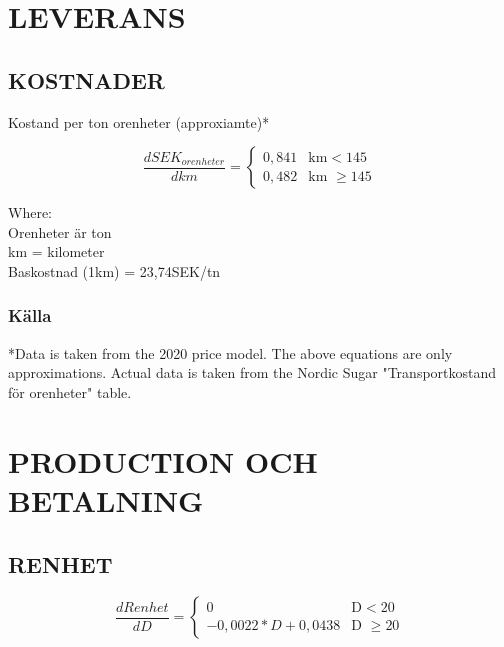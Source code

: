 \documentclass[fleqn]{article}
\begin{document}

\pagebreak
\section{LEVERANS}

  \subsection{KOSTNADER}
  
  Kostand per ton orenheter (approxiamte)*
  
  \begin{equation}
    \frac{dSEK_{orenheter}}{dkm} =
    \begin{cases}
      0,841 & \text{km} < 145\\
      0,482 & \text{km $\geq 145$}
    \end{cases}
  \end{equation}

  Where:\\
  \hangindent=1.5cm
  Orenheter är ton\\
  km = kilometer\\
  Baskostnad (1km) = 23,74SEK/tn
  
  \subsubsection{Källa}
  *Data is taken from the 2020 price model. The above equations are only approximations. 
  Actual data is taken from the Nordic Sugar "Transportkostand för orenheter" table. 


\pagebreak
\section{PRODUCTION OCH BETALNING}

  \subsection{RENHET}

  \begin{equation}
    \frac{dRenhet}{dD} =
    \begin{cases}
      0 & \text{D} < 20\\
      -0,0022*D + 0,0438 & \text{D $\geq 20$}
    \end{cases}
  \end{equation}
\end{document}
